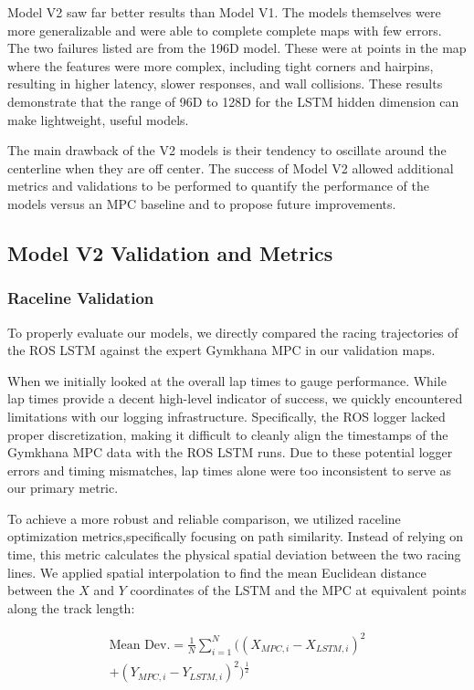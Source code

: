 \documentclass[conference]{IEEEtran}
\begin{document}
Model V2 saw far better results than Model V1. The models themselves were more generalizable and were able to complete complete maps with few errors. The two failures listed are from the 196D model. These were at points in the map where the features were more complex, including tight corners and hairpins, resulting in higher latency, slower responses, and wall collisions. These results demonstrate that the range of 96D to 128D for the LSTM hidden dimension can make lightweight, useful models.

The main drawback of the V2 models is their tendency to oscillate around the centerline when they are off center. The success of Model V2 allowed additional metrics and validations to be performed to quantify the performance of the models versus an MPC baseline and to propose future improvements. 

\subsection{Model V2 Validation and Metrics}

\subsubsection{Raceline Validation}

To properly evaluate our models, we directly compared the racing trajectories of the ROS LSTM against the expert Gymkhana MPC in our validation maps. 

When we initially looked at the overall lap times to gauge performance. While lap times provide a decent high-level indicator of success, we quickly encountered limitations with our logging infrastructure. Specifically, the ROS logger lacked proper discretization, making it difficult to cleanly align the timestamps of the Gymkhana MPC data with the ROS LSTM runs. Due to these potential logger errors and timing mismatches, lap times alone were too inconsistent to serve as our primary metric.

To achieve a more robust and reliable comparison, we utilized raceline optimization metrics,specifically focusing on path similarity. Instead of relying on time, this metric calculates the physical spatial deviation between the two racing lines. We applied spatial interpolation to find the mean Euclidean distance between the $X$ and $Y$ coordinates of the LSTM and the MPC at equivalent points along the track length:

\begin{multline}
    \text{Mean Dev.} = \frac{1}{N} \sum_{i=1}^{N} \Big( (X_{MPC, i} - X_{LSTM, i})^2 \\
    + (Y_{MPC, i} - Y_{LSTM, i})^2 \Big)^{\frac{1}{2}}
    \label{eq:deviation}
\end{multline}
\end{document}
